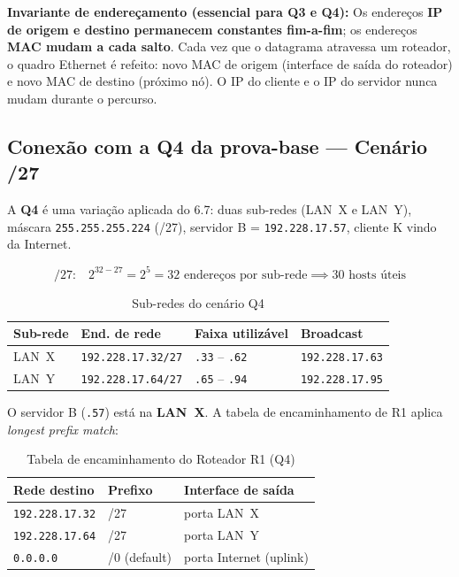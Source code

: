 \documentclass[11pt,a4paper]{article}
\begin{document}
\begin{reflexao}
\textbf{Invariante de endereçamento (essencial para Q3 e Q4):} Os endereços \textbf{IP de origem e destino permanecem constantes fim-a-fim}; os endereços \textbf{MAC mudam a cada salto}. Cada vez que o datagrama atravessa um roteador, o quadro Ethernet é refeito: novo MAC de origem (interface de saída do roteador) e novo MAC de destino (próximo nó). O IP do cliente e o IP do servidor nunca mudam durante o percurso.
\end{reflexao}

\subsection{Conexão com a Q4 da prova-base --- Cenário /27}

A \textbf{Q4} é uma variação aplicada do 6.7: duas sub-redes (LAN~X e LAN~Y), máscara \texttt{255.255.255.224} (/27), servidor B = \texttt{192.228.17.57}, cliente K vindo da Internet.

\[
\text{/27:} \quad 2^{32-27} = 2^5 = 32 \text{ endereços por sub-rede} \implies 30 \text{ hosts úteis}
\]

\begin{table}[h!]
\centering
\caption{Sub-redes do cenário Q4}
\label{tab:q4subredes}
\begin{tabular}{llll}
\toprule
\textbf{Sub-rede} & \textbf{End. de rede} & \textbf{Faixa utilizável} & \textbf{Broadcast} \\
\midrule
LAN~X & \texttt{192.228.17.32/27} & \texttt{.33} -- \texttt{.62} & \texttt{192.228.17.63} \\
LAN~Y & \texttt{192.228.17.64/27} & \texttt{.65} -- \texttt{.94} & \texttt{192.228.17.95} \\
\bottomrule
\end{tabular}
\end{table}

O servidor B (\texttt{.57}) está na \textbf{LAN~X}. A tabela de encaminhamento de R1 aplica \textit{longest prefix match}:

\begin{table}[h!]
\centering
\caption{Tabela de encaminhamento do Roteador R1 (Q4)}
\label{tab:r1forwarding}
\begin{tabular}{lll}
\toprule
\textbf{Rede destino} & \textbf{Prefixo} & \textbf{Interface de saída} \\
\midrule
\texttt{192.228.17.32} & /27 & porta LAN~X \\
\texttt{192.228.17.64} & /27 & porta LAN~Y \\
\texttt{0.0.0.0} & /0 (default) & porta Internet (uplink) \\
\bottomrule
\end{tabular}
\end{table}
\end{document}
